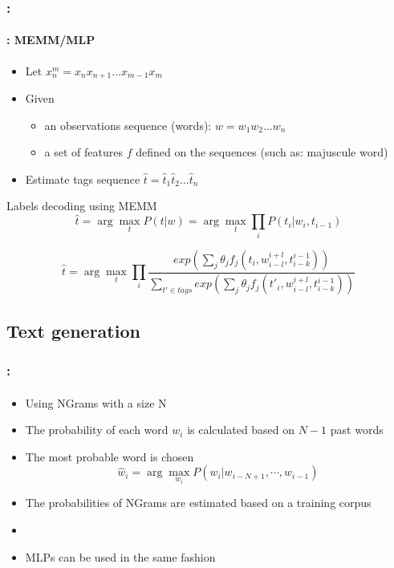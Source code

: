 \documentclass[xcolor=table]{beamer}
\begin{document}
\begin{frame}
	\frametitle{\insertshortsubtitle: \insertsection}
	\framesubtitle{\insertsubsection: MEMM/MLP}
	
	\begin{itemize}
			\item Let $x_{n}^{m} = x_n x_{n+1} \ldots x_{m-1} x_m$
			\item Given 
			\begin{itemize}
					\item an observations sequence (words): $w = w_1 w_2 \ldots w_n$
					\item a set of features $f$ defined on the sequences (such as: majuscule word)
				\end{itemize}
			\item Estimate tags sequence $\hat{t} = \hat{t}_1 \hat{t}_2 \ldots \hat{t}_n$
		\end{itemize}
	
	\begin{block}{Labels decoding using MEMM}
			\[
			\hat{t} = \arg\max\limits_t P(t | w) = \arg\max\limits_t \prod\limits_{i}  P(t_i | w_i, t_{i-1})
			\]
			
			\[
			\hat{t} = \arg\max\limits_t \prod\limits_{i}  
			\frac{exp\left(\sum_j \theta_j f_j(t_i, w_{i-l}^{i+l}, t_{i-k}^{i-1})\right)}%
			{\sum_{t' \in tags} exp\left(\sum_j \theta_j f_j(t'_i, w_{i-l}^{i+l}, t_{i-k}^{i-1})\right)}
			\]
		\end{block}
	
\end{frame}


\subsection{Text generation}

\begin{frame}
	\frametitle{\insertshortsubtitle: \insertsection}
	\framesubtitle{\insertsubsection}
	
	\begin{itemize}
		\item Using NGrams with a size N
		\item The probability of each word $ w_i $ is calculated based on $N-1$ past words
		\item The most probable word is chosen
		\[\hat{w}_i = \arg\max\limits_{w_i} P(w_i | w_{i-N+1}, \cdots, w_{i-1})\]
		\item The probabilities of NGrams are estimated based on a training corpus
		\item {}
		\item MLPs can be used in the same fashion
	\end{itemize}
	
\end{frame}
\end{document}
